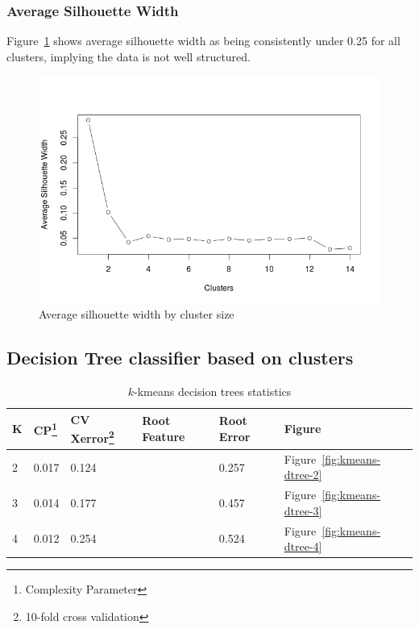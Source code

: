 \documentclass[letterpaper,12pt]{article}
\begin{document}
\subsubsection{Average Silhouette Width}

Figure~\ref{fig:asw} shows average silhouette width as being consistently under
0.25 for all clusters, implying the data is not well structured.

\begin{figure}[ht]
  \centering
  \includegraphics[width=0.8\linewidth]{asw.png}
  \caption{Average silhouette width by cluster size}
  \label{fig:asw}
\end{figure}


\subsection{Decision Tree classifier based on clusters}

\begin{table}[ht]
  \centering
  \begin{tabular}{l|l|l|l|l|l}
    K & CP\footnote{Complexity Parameter} & CV Xerror\footnote{10-fold cross
    validation} & Root Feature &
    Root Error & Figure \\
    \hline
    2 & 0.017 & 0.124 & & 0.257 & Figure~\ref{fig:kmeans-dtree-2} \\
    3 & 0.014 & 0.177 & & 0.457 & Figure~\ref{fig:kmeans-dtree-3} \\
    4 & 0.012 & 0.254 & & 0.524 & Figure~\ref{fig:kmeans-dtree-4} \\
  \end{tabular}
  \caption{$k$-kmeans decision trees statistics}
  \label{tab:k-means-dtrees}
\end{table}
\end{document}
